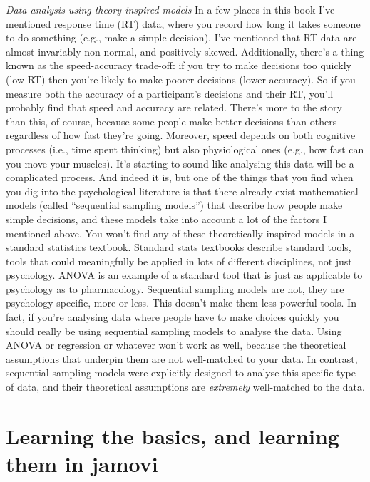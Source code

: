 \documentclass[
]{book}
\begin{document}
\begin{itemize}
  \emph{Data analysis using theory-inspired models} In a few places in this book I've mentioned response time (RT) data, where you record how long it takes someone to do something (e.g., make a simple decision). I've mentioned that RT data are almost invariably non-normal, and positively skewed. Additionally, there's a thing known as the speed-accuracy trade-off: if you try to make decisions too quickly (low RT) then you're likely to make poorer decisions (lower accuracy). So if you measure both the accuracy of a participant's decisions and their RT, you'll probably find that speed and accuracy are related. There's more to the story than this, of course, because some people make better decisions than others regardless of how fast they're going. Moreover, speed depends on both cognitive processes (i.e., time spent thinking) but also physiological ones (e.g., how fast can you move your muscles). It's starting to sound like analysing this data will be a complicated process. And indeed it is, but one of the things that you find when you dig into the psychological literature is that there already exist mathematical models (called ``sequential sampling models'') that describe how people make simple decisions, and these models take into account a lot of the factors I mentioned above. You won't find any of these theoretically-inspired models in a standard statistics textbook. Standard stats textbooks describe standard tools, tools that could meaningfully be applied in lots of different disciplines, not just psychology. ANOVA is an example of a standard tool that is just as applicable to psychology as to pharmacology. Sequential sampling models are not, they are psychology-specific, more or less. This doesn't make them less powerful tools. In fact, if you're analysing data where people have to make choices quickly you should really be using sequential sampling models to analyse the data. Using ANOVA or regression or whatever won't work as well, because the theoretical assumptions that underpin them are not well-matched to your data. In contrast, sequential sampling models were explicitly designed to analyse this specific type of data, and their theoretical assumptions are \emph{extremely} well-matched to the data.
\end{itemize}

\hypertarget{learning-the-basics-and-learning-them-in-jamovi}{%
\section{Learning the basics, and learning them in jamovi}\label{learning-the-basics-and-learning-them-in-jamovi}}
\end{document}
